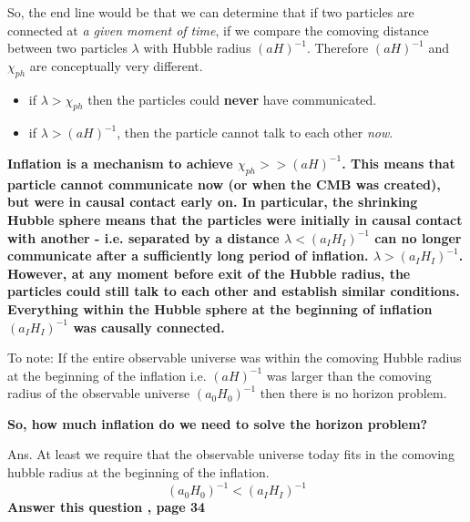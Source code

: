 \documentclass[12pt]{report}
\newcommand{\tbf}[1]{\textbf{#1}}
\newcommand{\tit}[1]{\textit{#1}}
\begin{document}
So, the end line would be that we can determine that if two particles are connected at \tit{a given moment of time}, if we compare the comoving distance between two particles $\lambda$ with Hubble radius $(aH)^{-1}$. Therefore $(aH)^{-1}$ and $\chi_{ph}$ are conceptually very different.

\begin{itemize}
\item if $\lambda>\chi_{ph}$ then the particles could \tbf{never} have communicated.
\item if $\lambda>(aH)^{-1}$, then the particle cannot talk to each other \tit{now}.
\end{itemize}

\tbf{Inflation is a mechanism to achieve $\chi_{ph}>>(aH)^{-1}$. This means that particle cannot communicate now (or when the CMB was created), but were in causal contact early on. In particular, the shrinking Hubble sphere means that the particles were initially in causal contact with another - i.e. separated by a distance $\lambda<(a_I H_I)^{-1}$ can no longer communicate after a sufficiently long period of inflation. $\lambda>(a_I H_I)^{-1}$. However, at any moment before exit of the Hubble radius, the particles could still talk to each other and establish similar conditions. Everything within the Hubble sphere at the beginning of inflation $(a_I H_I)^{-1}$ was causally connected.}

To note: If the entire observable universe was within the comoving Hubble radius at the beginning of the inflation i.e. $(aH)^{-1}$ was larger than the comoving radius of the observable universe $(a_0H_0)^{-1}$ then there is no horizon problem.

\tbf{So, how much inflation do we need to solve the horizon problem?}

Ans. At least we require that the observable universe today fits in the comoving hubble radius at the beginning of the inflation.
\begin{equation}
(a_0H_0)^{-1}<(a_IH_I)^{-1}
\end{equation}
\tbf{Answer this question , page 34}
\end{document}
